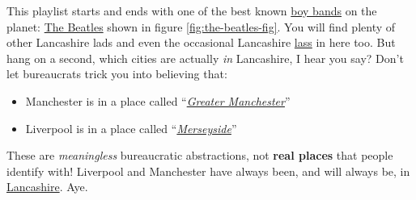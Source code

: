 \documentclass[
]{book}
\providecommand{\tightlist}{%
  \setlength{\itemsep}{0pt}\setlength{\parskip}{0pt}}
\begin{document}
This playlist starts and ends with one of the best known \href{https://en.wikipedia.org/wiki/Boy_band}{boy bands} on the planet: \href{https://en.wikipedia.org/wiki/The_Beatles}{The Beatles} shown in figure \ref{fig:the-beatles-fig}. You will find plenty of other Lancashire lads and even the occasional Lancashire \href{https://en.wikipedia.org/wiki/Lass}{lass} in here too. But hang on a second, which cities are actually \emph{in} Lancashire, I hear you say? Don't let bureaucrats trick you into believing that:

\begin{itemize}
\tightlist
\item
  Manchester is in a place called ``\emph{\href{https://en.wikipedia.org/wiki/Greater_Manchester}{Greater Manchester}}''
\item
  Liverpool is in a place called ``\emph{\href{https://en.wikipedia.org/wiki/Merseyside}{Merseyside}}''
\end{itemize}

These are \emph{meaningless} bureaucratic abstractions, not \textbf{real places} that people identify with! Liverpool and Manchester have always been, and will always be, in \href{https://en.wikipedia.org/wiki/Lancashire}{Lancashire}. Aye. \citep{northerners}
\end{document}
